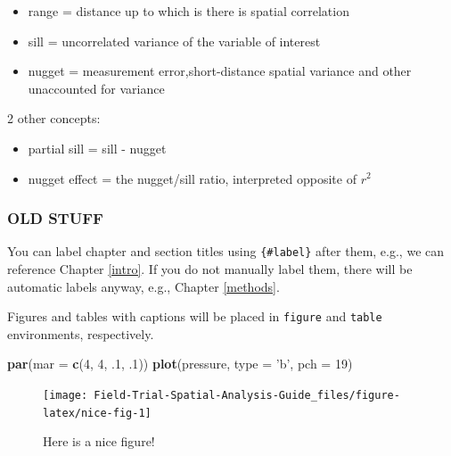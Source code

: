 \documentclass[]{book}
\newenvironment{Shaded}{\begin{snugshade}}{\end{snugshade}}
\newcommand{\DataTypeTok}[1]{\textcolor[rgb]{0.13,0.29,0.53}{#1}}
\newcommand{\DecValTok}[1]{\textcolor[rgb]{0.00,0.00,0.81}{#1}}
\newcommand{\FloatTok}[1]{\textcolor[rgb]{0.00,0.00,0.81}{#1}}
\newcommand{\KeywordTok}[1]{\textcolor[rgb]{0.13,0.29,0.53}{\textbf{#1}}}
\newcommand{\NormalTok}[1]{#1}
\newcommand{\StringTok}[1]{\textcolor[rgb]{0.31,0.60,0.02}{#1}}
\providecommand{\tightlist}{%
  \setlength{\itemsep}{0pt}\setlength{\parskip}{0pt}}
\begin{document}
\begin{itemize}
\tightlist
\item
  range = distance up to which is there is spatial correlation
\item
  sill = uncorrelated variance of the variable of interest
\item
  nugget = measurement error,short-distance spatial variance and other unaccounted for variance
\end{itemize}

2 other concepts:

\begin{itemize}
\tightlist
\item
  partial sill = sill - nugget
\item
  nugget effect = the nugget/sill ratio, interpreted opposite of \(r^2\)
\end{itemize}

\hypertarget{old-stuff-1}{%
\subsubsection{OLD STUFF}\label{old-stuff-1}}

You can label chapter and section titles using \texttt{\{\#label\}} after them, e.g., we can reference Chapter \ref{intro}. If you do not manually label them, there will be automatic labels anyway, e.g., Chapter \ref{methods}.

Figures and tables with captions will be placed in \texttt{figure} and \texttt{table} environments, respectively.

\begin{Shaded}
\begin{Highlighting}[]
\KeywordTok{par}\NormalTok{(}\DataTypeTok{mar =} \KeywordTok{c}\NormalTok{(}\DecValTok{4}\NormalTok{, }\DecValTok{4}\NormalTok{, }\FloatTok{.1}\NormalTok{, }\FloatTok{.1}\NormalTok{))}
\KeywordTok{plot}\NormalTok{(pressure, }\DataTypeTok{type =} \StringTok{'b'}\NormalTok{, }\DataTypeTok{pch =} \DecValTok{19}\NormalTok{)}
\end{Highlighting}
\end{Shaded}

\begin{figure}

{\centering \texttt{[image: Field-Trial-Spatial-Analysis-Guide\_files/figure-latex/nice-fig-1]} 

}

\caption{Here is a nice figure!}\label{fig:nice-fig}
\end{figure}
\end{document}
